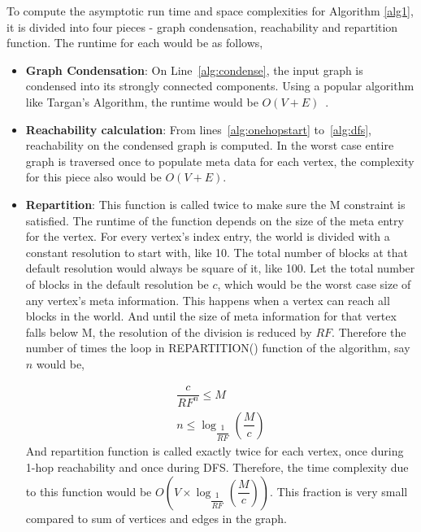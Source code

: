 To compute the asymptotic run time and space complexities for Algorithm \ref{alg1}, it is divided into four pieces - graph condensation, reachability and repartition function. The runtime for each would be as follows,
\begin{itemize}

  \item \textbf{Graph Condensation}: On Line~\ref{alg:condense}, the input graph is condensed into its strongly connected components. Using a popular algorithm like Targan's Algorithm, the runtime would be $O(V + E)$~\cite{R1972}.

  \item \textbf{Reachability calculation}: From lines~\ref{alg:onehopstart} to~\ref{alg:dfs}, reachability on the condensed graph is computed. In the worst case entire graph is traversed once to populate meta data for each vertex, the complexity for this piece also would be $O(V + E)$.


  \item \textbf{Repartition}: This function is called twice to make sure the M constraint is satisfied. The runtime of the function depends on the size of the meta entry for the vertex. For every vertex's index entry, the world is divided with a constant resolution to start with, like 10. The total number of blocks at that default resolution would always be square of it, like 100. Let the total number of blocks in the default resolution be $c$, which would be the worst case size of any vertex's meta information. This happens when a vertex can reach all blocks in the world. And until the size of meta information for that vertex falls below M, the resolution of the division is reduced by $RF$. Therefore the number of times the loop in REPARTITION() function of the algorithm, say $n$ would be,

  \begin{eqnarray*}
  	\dfrac{c}{RF^n} \leq M\\
  	n \leq {\log_{\dfrac{1}{RF}} (\dfrac{M}{c})}
  \end{eqnarray*}
  And repartition function is called exactly twice for each vertex, once during 1-hop reachability and once during DFS. Therefore, the time complexity due to this function would be $O(V \times {\log_{\dfrac{1}{RF}} (\dfrac{M}{c})})$. This fraction is very small compared to sum of vertices and edges in the graph.
\end{itemize}

